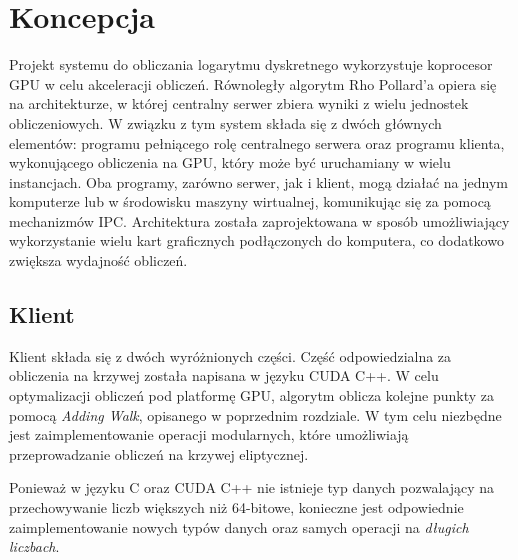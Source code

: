 \newpage
\section{Koncepcja}

Projekt systemu do obliczania logarytmu dyskretnego wykorzystuje koprocesor GPU w celu akceleracji obliczeń.
Równoległy algorytm Rho Pollard'a opiera się na architekturze, w której centralny serwer zbiera wyniki
z wielu jednostek obliczeniowych. W związku z tym system składa się z dwóch głównych elementów:
programu pełniącego rolę centralnego serwera oraz programu klienta, wykonującego obliczenia na GPU,
który może być uruchamiany w wielu instancjach.
Oba programy, zarówno serwer, jak i klient, mogą działać na jednym komputerze
lub w środowisku maszyny wirtualnej, komunikując się za pomocą mechanizmów IPC.
Architektura została zaprojektowana w sposób umożliwiający wykorzystanie wielu kart graficznych
podłączonych do komputera, co dodatkowo zwiększa wydajność obliczeń.

\subsection{Klient}
Klient składa się z dwóch wyróżnionych części.
Część odpowiedzialna za obliczenia na krzywej została napisana w języku
CUDA C++. W celu optymalizacji obliczeń pod platformę GPU, algorytm oblicza
kolejne punkty za pomocą \textit{Adding Walk}, opisanego w poprzednim
rozdziale. W tym celu niezbędne jest zaimplementowanie operacji modularnych,
które umożliwiają przeprowadzanie obliczeń na krzywej eliptycznej.

Ponieważ w języku C oraz CUDA C++ nie istnieje typ danych pozwalający na
przechowywanie liczb większych niż 64-bitowe, konieczne jest odpowiednie
zaimplementowanie nowych typów danych oraz samych operacji na \textit{długich liczbach}.

